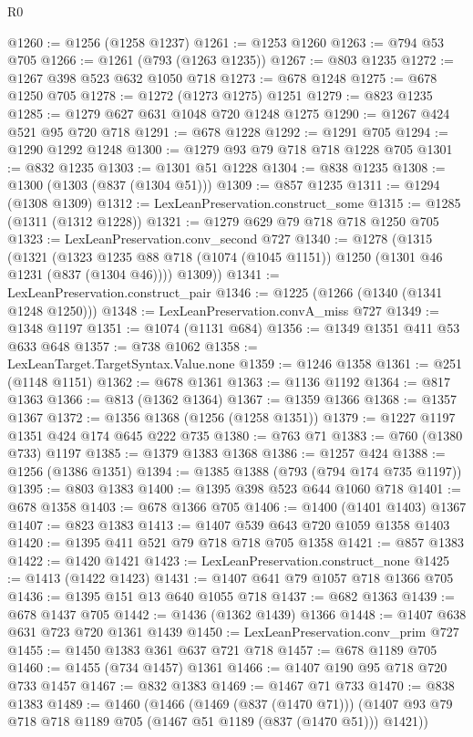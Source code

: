 \begin{lexlean}{R0}
\begin{coremodule}
{{{{{{{{{{{{{{{{{{{{{{{{{{{{{{{{@1260 := @1256 (@1258 @1237)
@1261 := @1253 @1260
@1263 := @794 @53 @705
@1266 := @1261 (@793 (@1263 @1235))
@1267 := @803 @1235
@1272 := @1267 @398 @523 @632 @1050 @718
@1273 := @678 @1248
@1275 := @678 @1250 @705
@1278 := @1272 (@1273 @1275) @1251
@1279 := @823 @1235
@1285 := @1279 @627 @631 @1048 @720 @1248 @1275
@1290 := @1267 @424 @521 @95 @720 @718
@1291 := @678 @1228
@1292 := @1291 @705
@1294 := @1290 @1292 @1248
@1300 := @1279 @93 @79 @718 @718 @1228 @705
@1301 := @832 @1235
@1303 := @1301 @51 @1228
@1304 := @838 @1235
@1308 := @1300 (@1303 (@837 (@1304 @51)))
@1309 := @857 @1235
@1311 := @1294 (@1308 @1309)
@1312 := LexLeanPreservation.construct_some
@1315 := @1285 (@1311 (@1312 @1228))
@1321 := @1279 @629 @79 @718 @718 @1250 @705
@1323 := LexLeanPreservation.conv_second @727
@1340 := @1278
    (@1315
      (@1321
        (@1323 @1235 @88 @718 (@1074 (@1045 @1151)) @1250 (@1301 @46 @1231 (@837 (@1304 @46))))
        @1309))
@1341 := LexLeanPreservation.construct_pair
@1346 := @1225 (@1266 (@1340 (@1341 @1248 @1250)))
@1348 := LexLeanPreservation.convA_miss @727
@1349 := @1348 @1197
@1351 := @1074 (@1131 @684)
@1356 := @1349 @1351 @411 @53 @633 @648
@1357 := @738 @1062
@1358 := LexLeanTarget.TargetSyntax.Value.none
@1359 := @1246 @1358
@1361 := @251 (@1148 @1151)
@1362 := @678 @1361
@1363 := @1136 @1192
@1364 := @817 @1363
@1366 := @813 (@1362 @1364)
@1367 := @1359 @1366
@1368 := @1357 @1367
@1372 := @1356 @1368 (@1256 (@1258 @1351))
@1379 := @1227 @1197 @1351 @424 @174 @645 @222 @735
@1380 := @763 @71
@1383 := @760 (@1380 @733) @1197
@1385 := @1379 @1383 @1368
@1386 := @1257 @424
@1388 := @1256 (@1386 @1351)
@1394 := @1385 @1388 (@793 (@794 @174 @735 @1197))
@1395 := @803 @1383
@1400 := @1395 @398 @523 @644 @1060 @718
@1401 := @678 @1358
@1403 := @678 @1366 @705
@1406 := @1400 (@1401 @1403) @1367
@1407 := @823 @1383
@1413 := @1407 @539 @643 @720 @1059 @1358 @1403
@1420 := @1395 @411 @521 @79 @718 @718 @705 @1358
@1421 := @857 @1383
@1422 := @1420 @1421
@1423 := LexLeanPreservation.construct_none
@1425 := @1413 (@1422 @1423)
@1431 := @1407 @641 @79 @1057 @718 @1366 @705
@1436 := @1395 @151 @13 @640 @1055 @718
@1437 := @682 @1363
@1439 := @678 @1437 @705
@1442 := @1436 (@1362 @1439) @1366
@1448 := @1407 @638 @631 @723 @720 @1361 @1439
@1450 := LexLeanPreservation.conv_prim @727
@1455 := @1450 @1383 @361 @637 @721 @718
@1457 := @678 @1189 @705
@1460 := @1455 (@734 @1457) @1361
@1466 := @1407 @190 @95 @718 @720 @733 @1457
@1467 := @832 @1383
@1469 := @1467 @71 @733
@1470 := @838 @1383
@1489 := @1460
    (@1466
      (@1469 (@837 (@1470 @71)))
      (@1407 @93 @79 @718 @718 @1189 @705 (@1467 @51 @1189 (@837 (@1470 @51))) @1421))
}}}}}}}}}}}}}}}}}}}}}}}}}}}}}}}}
\end{coremodule}
\end{lexlean}
